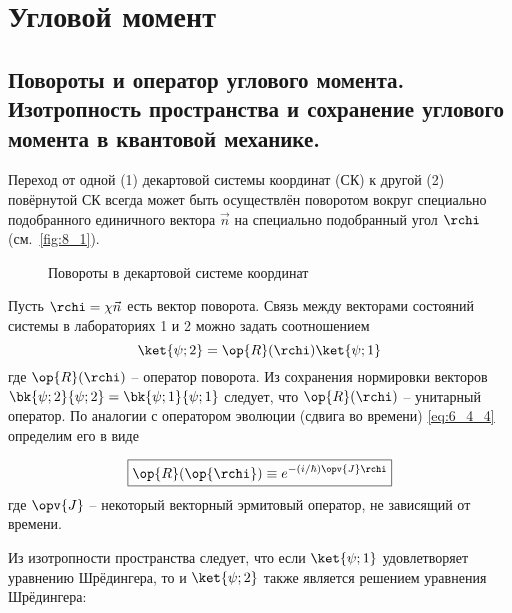 \chapter{Угловой момент}

\section{Повороты и оператор углового момента. Изотропность пространства и сохранение углового момента в квантовой механике.}

Переход от одной (1) декартовой системы координат (СК) к другой (2) повёрнутой СК всегда может быть осуществлён поворотом вокруг специально подобранного единичного вектора $\vec{n}$ на специально подобранный угол $\rchi$ (см.~\autoref{fig:8_1}).

\begin{figure}[h]
\centering
{}
\caption{Повороты в декартовой системе координат} \label{fig:8_1}
\end{figure}

Пусть $\rchi = \chi \vec{n}$ есть вектор поворота. Связь между векторами состояний системы в лабораториях 1 и 2 можно задать соотношением
$$
\ket{\psi;2} = \op{R}(\rchi) \ket{\psi;1}
$$%
%
где $\op{R}(\rchi)$ -- оператор поворота. Из сохранения нормировки векторов $\bk{\psi;2}{\psi;2} = \bk{\psi;1}{\psi;1}$ следует, что $\op{R}(\rchi)$ -- унитарный оператор. По аналогии с оператором эволюции (сдвига во времени) \eqref{eq:6_4_4} определим его в виде

\begin{equation}
\label{eq:8_1_1}
\boxed {
	\op{R}(\op{\rchi}) \equiv e^{-(i/\hbar) \opv{J} \rchi}
}
\end{equation}
где $\opv{J}$ -- некоторый векторный эрмитовый оператор, не зависящий от времени.

Из изотропности пространства следует, что если $\ket{\psi;1}$ удовлетворяет уравнению Шрёдингера, то и $\ket{\psi;2}$ также является решением уравнения Шрёдингера:

